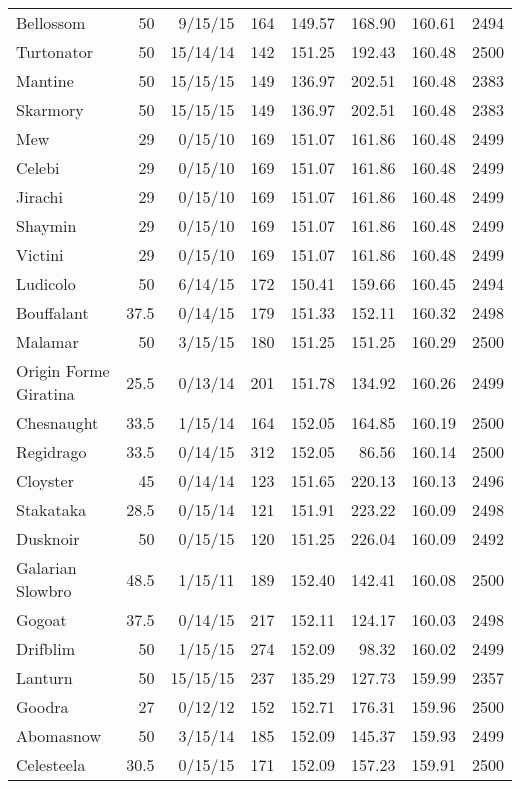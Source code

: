 \begin{longtable}{lrrrrrrr}
Bellossom & 50 & 9/15/15 & 164 & 149.57 & 168.90 & 160.61 & 2494\\
Turtonator & 50 & 15/14/14 & 142 & 151.25 & 192.43 & 160.48 & 2500\\
Mantine & 50 & 15/15/15 & 149 & 136.97 & 202.51 & 160.48 & 2383\\
Skarmory & 50 & 15/15/15 & 149 & 136.97 & 202.51 & 160.48 & 2383\\
Mew & 29 & 0/15/10 & 169 & 151.07 & 161.86 & 160.48 & 2499\\
Celebi & 29 & 0/15/10 & 169 & 151.07 & 161.86 & 160.48 & 2499\\
Jirachi & 29 & 0/15/10 & 169 & 151.07 & 161.86 & 160.48 & 2499\\
Shaymin & 29 & 0/15/10 & 169 & 151.07 & 161.86 & 160.48 & 2499\\
Victini & 29 & 0/15/10 & 169 & 151.07 & 161.86 & 160.48 & 2499\\
Ludicolo & 50 & 6/14/15 & 172 & 150.41 & 159.66 & 160.45 & 2494\\
Bouffalant & 37.5 & 0/14/15 & 179 & 151.33 & 152.11 & 160.32 & 2498\\
Malamar & 50 & 3/15/15 & 180 & 151.25 & 151.25 & 160.29 & 2500\\
Origin Forme Giratina & 25.5 & 0/13/14 & 201 & 151.78 & 134.92 & 160.26 & 2499\\
Chesnaught & 33.5 & 1/15/14 & 164 & 152.05 & 164.85 & 160.19 & 2500\\
Regidrago & 33.5 & 0/14/15 & 312 & 152.05 & 86.56 & 160.14 & 2500\\
Cloyster & 45 & 0/14/14 & 123 & 151.65 & 220.13 & 160.13 & 2496\\
Stakataka & 28.5 & 0/15/14 & 121 & 151.91 & 223.22 & 160.09 & 2498\\
Dusknoir & 50 & 0/15/15 & 120 & 151.25 & 226.04 & 160.09 & 2492\\
Galarian Slowbro & 48.5 & 1/15/11 & 189 & 152.40 & 142.41 & 160.08 & 2500\\
Gogoat & 37.5 & 0/14/15 & 217 & 152.11 & 124.17 & 160.03 & 2498\\
Drifblim & 50 & 1/15/15 & 274 & 152.09 & 98.32 & 160.02 & 2499\\
Lanturn & 50 & 15/15/15 & 237 & 135.29 & 127.73 & 159.99 & 2357\\
Goodra & 27 & 0/12/12 & 152 & 152.71 & 176.31 & 159.96 & 2500\\
Abomasnow & 50 & 3/15/14 & 185 & 152.09 & 145.37 & 159.93 & 2499\\
Celesteela & 30.5 & 0/15/15 & 171 & 152.09 & 157.23 & 159.91 & 2500\\

\end{longtable}
